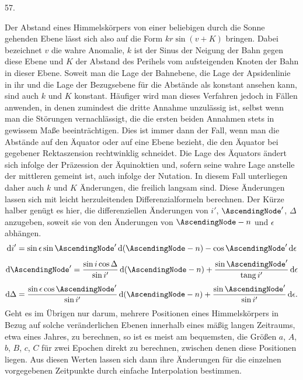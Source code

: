 \par\medskip
\hypertarget{native-075-article057}{}
\begin{center}57.\end{center}
Der Abstand eines Himmelskörpers von einer beliebigen durch die Sonne gehenden Ebene lässt sich also auf die Form $kr\sin(v + K)$ bringen. Dabei bezeichnet $v$ die wahre Anomalie, $k$ ist der Sinus der Neigung der Bahn gegen diese Ebene und $K$ der Abstand des Perihels vom aufsteigenden Knoten der Bahn in dieser Ebene. Soweit man die Lage der Bahnebene, die Lage der Apsidenlinie in ihr und die Lage der Bezugsebene für die Abstände als konstant ansehen kann, sind auch $k$ und $K$ konstant. Häufiger wird man dieses Verfahren jedoch in Fällen anwenden, in denen zumindest die dritte Annahme unzulässig ist, selbst wenn man die Störungen vernachlässigt, die die ersten beiden Annahmen stets in gewissem Maße beeinträchtigen. Dies ist immer dann der Fall, wenn man die Abstände auf den
Äquator oder auf eine Ebene bezieht, die den Äquator bei gegebener Rektaszension rechtwinklig schneidet. Die Lage des Äquators ändert sich infolge der Präzession der Äquinoktien und, sofern seine wahre Lage anstelle der mittleren gemeint ist, auch infolge der Nutation. In diesem Fall unterliegen daher auch $k$ und $K$ Änderungen, die freilich langsam sind.
Diese Änderungen lassen sich mit leicht herzuleitenden Differenzialformeln berechnen. Der Kürze halber genügt es hier, die differenziellen Änderungen von $i'$, $\AscendingNode'$,
$\Delta$ anzugeben, soweit sie von den Änderungen von $\AscendingNode - n$
und $\epsilon$ abhängen.
\[
\mathrm{d}i' = \sin\epsilon \sin\AscendingNode'\, \mathrm{d}(\AscendingNode - n) - \cos\AscendingNode'\, \mathrm{d}\epsilon
\]
\[
\mathrm{d}\AscendingNode' = \frac{\sin i \cos\Delta}{\sin i'}\, \mathrm{d}(\AscendingNode - n) + \frac{\sin\AscendingNode'}{\operatorname{tang} i'}\, \mathrm{d}\epsilon
\]
\[
\mathrm{d}\Delta = \frac{\sin\epsilon \cos\AscendingNode'}{\sin i'}\, \mathrm{d}(\AscendingNode - n) + \frac{\sin\AscendingNode'}{\sin i'}\, \mathrm{d}\epsilon.
\]
Geht es im Übrigen nur darum, mehrere Positionen eines Himmelskörpers in Bezug auf solche veränderlichen Ebenen innerhalb eines mäßig langen Zeitraums, etwa eines Jahres, zu berechnen, so ist es meist am bequemsten, die Größen $a$, $A$, $b$, $B$, $c$, $C$ für zwei Epochen direkt zu berechnen, zwischen denen diese Positionen liegen. Aus diesen Werten lassen sich dann ihre Änderungen für die einzelnen vorgegebenen Zeitpunkte durch einfache Interpolation bestimmen.
